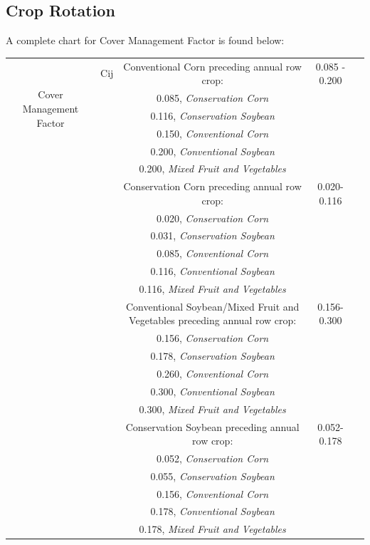 \documentclass[11pt]{article}
\begin{document}
\subsection{Crop Rotation}
A complete chart for Cover Management Factor is found below:
\begin{center}
\begin{tabular}{ |c|c|c|c|c| } 
\hline
\multirow{5}{3em}{Cover Management Factor} & Cij & Conventional Corn preceding annual row crop: & 0.085 - 0.200 \\ 
& & 0.085, \textit{Conservation Corn} & \\ 
& & 0.116, \textit{Conservation Soybean} & \\ 
& & 0.150, \textit{Conventional Corn} & \\
& & 0.200, \textit{Conventional Soybean}  & \\
& & 0.200, \textit{Mixed Fruit and Vegetables} & \\
& & Conservation Corn preceding annual row crop:  & 0.020-0.116\\
& & 0.020, \textit{Conservation Corn}  & \\
& & 0.031, \textit{Conservation Soybean} & \\
& & 0.085, \textit{Conventional Corn} & \\
& & 0.116, \textit{Conventional Soybean} & \\
& & 0.116, \textit{Mixed Fruit and Vegetables} & \\
& & Conventional Soybean/Mixed Fruit and Vegetables 
preceding annual row crop: & 0.156-0.300\\
& & 0.156, \textit{Conservation Corn} & \\
& & 0.178, \textit{Conservation Soybean} & \\
& & 0.260, \textit{Conventional Corn} & \\
& & 0.300, \textit{Conventional Soybean} & \\
& & 0.300, \textit{Mixed Fruit and Vegetables} & \\
& & Conservation Soybean preceding annual row crop: & 0.052-0.178\\
& & 0.052, \textit{Conservation Corn} & \\
& & 0.055, \textit{Conservation Soybean} & \\
& & 0.156, \textit{Conventional Corn} & \\
& & 0.178, \textit{Conventional Soybean} & \\
& & 0.178, \textit{Mixed Fruit and Vegetables} & \\

\hline
\end{tabular}
\end{center}
\end{document}
